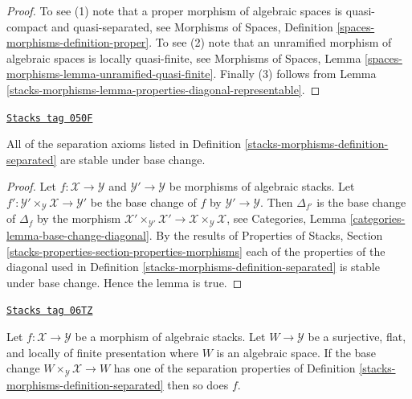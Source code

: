 \begin{proof}
To see (1) note that a proper morphism of algebraic spaces is quasi-compact
and quasi-separated, see
Morphisms of Spaces, Definition \ref{spaces-morphisms-definition-proper}.
To see (2) note that an unramified morphism of algebraic spaces is locally
quasi-finite, see
Morphisms of Spaces, Lemma
\ref{spaces-morphisms-lemma-unramified-quasi-finite}.
Finally (3) follows from Lemma \ref{stacks-morphisms-lemma-properties-diagonal-representable}.
\end{proof}

\begin{lemma}
\label{stacks-morphisms-lemma-base-change-separated}
\href{https://stacks.math.columbia.edu/tag/050F}{\texttt{Stacks tag 050F}}

All of the separation axioms listed in
Definition \ref{stacks-morphisms-definition-separated}
are stable under base change.
\end{lemma}

\begin{proof}
Let $f : \mathcal{X} \to \mathcal{Y}$ and
$\mathcal{Y}' \to \mathcal{Y}$ be morphisms of algebraic stacks.
Let $f' : \mathcal{Y}' \times_\mathcal{Y} \mathcal{X} \to \mathcal{Y}'$
be the base change of $f$ by $\mathcal{Y}' \to \mathcal{Y}$.
Then $\Delta_{f'}$ is the base change of $\Delta_f$ by the morphism
$\mathcal{X}' \times_{\mathcal{Y}'} \mathcal{X}' \to
\mathcal{X} \times_\mathcal{Y} \mathcal{X}$, see
Categories, Lemma \ref{categories-lemma-base-change-diagonal}.
By the results of
Properties of Stacks,
Section \ref{stacks-properties-section-properties-morphisms}
each of the properties of the diagonal used in
Definition \ref{stacks-morphisms-definition-separated}
is stable under base change. Hence the lemma is true.
\end{proof}

\begin{lemma}
\label{stacks-morphisms-lemma-check-separated-covering}
\href{https://stacks.math.columbia.edu/tag/06TZ}{\texttt{Stacks tag 06TZ}}

Let $f : \mathcal{X} \to \mathcal{Y}$ be a morphism of algebraic stacks.
Let $W \to \mathcal{Y}$ be a surjective, flat, and locally of finite
presentation where $W$ is an algebraic space. If the base change
$W \times_\mathcal{Y} \mathcal{X} \to W$ has one of the separation properties
of Definition \ref{stacks-morphisms-definition-separated}
then so does $f$.
\end{lemma}

